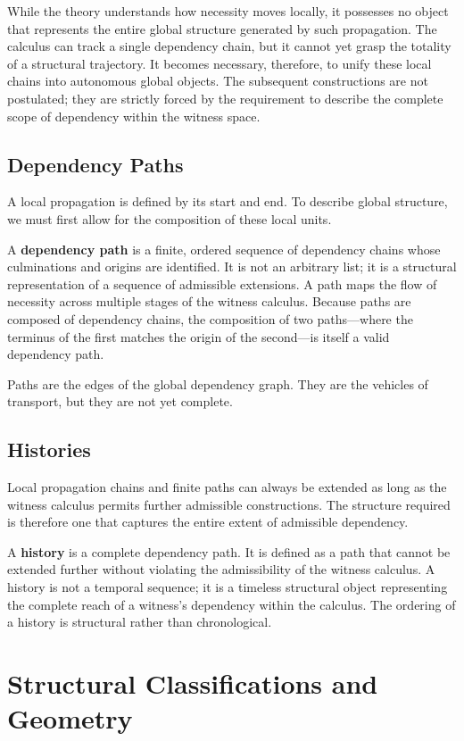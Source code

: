 \documentclass[12pt,anyside]{book}
\begin{document}
While the theory understands how necessity moves locally, it possesses no object that represents the entire global structure generated by such propagation. The calculus can track a single dependency chain, but it cannot yet grasp the totality of a structural trajectory. It becomes necessary, therefore, to unify these local chains into autonomous global objects. The subsequent constructions are not postulated; they are strictly forced by the requirement to describe the complete scope of dependency within the witness space.

\subsection{Dependency Paths}
A local propagation is defined by its start and end. To describe global structure, we must first allow for the composition of these local units.

A \textbf{dependency path} is a finite, ordered sequence of dependency chains whose culminations and origins are identified. It is not an arbitrary list; it is a structural representation of a sequence of admissible extensions. A path maps the flow of necessity across multiple stages of the witness calculus. Because paths are composed of dependency chains, the composition of two paths---where the terminus of the first matches the origin of the second---is itself a valid dependency path. 

Paths are the edges of the global dependency graph. They are the vehicles of transport, but they are not yet complete.

\subsection{Histories}
Local propagation chains and finite paths can always be extended as long as the witness calculus permits further admissible constructions. The structure required is therefore one that captures the entire extent of admissible dependency.

A \textbf{history} is a complete dependency path. It is defined as a path that cannot be extended further without violating the admissibility of the witness calculus. A history is not a temporal sequence; it is a timeless structural object representing the complete reach of a witness’s dependency within the calculus. The ordering of a history is structural rather than chronological.

\section{Structural Classifications and Geometry}
\end{document}

